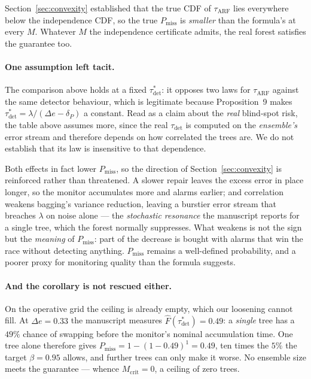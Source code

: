\documentclass[11pt,a4paper]{article}
\begin{document}
Section~\ref{sec:convexity} established that the true CDF of $\tau_{\mathrm{ARF}}$ lies
everywhere below the independence CDF, so the true $P_{\mathrm{miss}}$ is \emph{smaller}
than the formula's at every $M$. Whatever $M$ the independence certificate admits, the
real forest satisfies the guarantee too.

\begin{center}
\end{center}

\paragraph{One assumption left tacit.} The comparison above holds at a fixed
$\tau^*_{\mathrm{det}}$: it opposes two laws for $\tau_{\mathrm{ARF}}$ against the same
detector behaviour, which is legitimate because Proposition~9 makes
$\tau^*_{\mathrm{det}} = \lambda/(\Delta e - \delta_P)$ a constant. Read as a claim about
the \emph{real} blind-spot risk, the table above assumes more, since the real
$\tau_{\mathrm{det}}$ is computed on the \emph{ensemble's} error stream and therefore
depends on how correlated the trees are. We do not establish that its law is insensitive
to that dependence.

Both effects in fact lower $P_{\mathrm{miss}}$, so the direction of
Section~\ref{sec:convexity} is reinforced rather than threatened. A slower repair leaves
the excess error in place longer, so the monitor accumulates more and alarms earlier; and
correlation weakens bagging's variance reduction, leaving a burstier error stream that
breaches $\lambda$ on noise alone --- the \emph{stochastic resonance} the manuscript
reports for a single tree, which the forest normally suppresses. What weakens is not the
sign but the \emph{meaning} of $P_{\mathrm{miss}}$: part of the decrease is bought with
alarms that win the race without detecting anything. $P_{\mathrm{miss}}$ remains a
well-defined probability, and a poorer proxy for monitoring quality than the formula
suggests.

\paragraph{And the corollary is not rescued either.} On the operative grid the ceiling is
already empty, which our loosening cannot fill. At $\Delta e = 0.33$ the manuscript
measures $\widehat F(\tau^*_{\mathrm{det}}) = 0.49$: a \emph{single} tree has a $49\%$
chance of swapping before the monitor's nominal accumulation time. One tree alone
therefore gives $P_{\mathrm{miss}} = 1 - (1-0.49)^1 = 0.49$, ten times the $5\%$ the
target $\beta = 0.95$ allows, and further trees can only make it worse. No ensemble size
meets the guarantee --- whence $M_{\mathrm{crit}} = 0$, a ceiling of zero trees.
\end{document}
